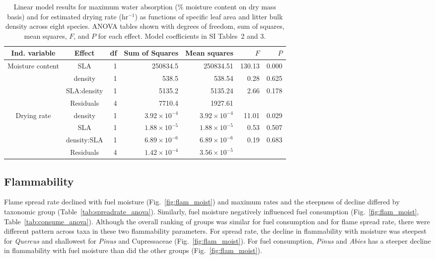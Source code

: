 \documentclass[letterpaper,12pt]{article}
\begin{document}
\begin{table}
  \caption{Linear model results for maximum water absorption (\% moisture
    content on dry mass basis) and for estimated drying rate (hr$^{-1}$) as
    functions of specific leaf area and litter bulk density across eight
    species. ANOVA tables shown with degrees of freedom, sum of squares, mean
    squares, $F$, and $P$ for each effect. Model coefficients in SI Tables~2 and 3.}
  \label{tab:mc_di_anova}
\centering
\begin{tabular}{ccrrrrr}
  \toprule
Ind. variable & Effect & df & Sum of Squares & Mean squares & $F$ & $P$ \\ 
  \midrule
Moisture content & SLA & 1 & 250834.5 & 250834.51 & 130.13 & 0.000 \\ 
                 & density & 1 & 538.5 & 538.54 & 0.28 & 0.625 \\ 
                 & SLA:density & 1 & 5135.2 & 5135.24 & 2.66 & 0.178 \\ 
                 & Residuals & 4 & 7710.4 & 1927.61 &  &  \\ 
  \midrule
Drying rate & density & 1 & $3.92 \times 10^{-4}$ & $3.92 \times 10^{-4}$ & 11.01 & 0.029 \\ 
            &  SLA & 1 & $1.88 \times 10^{-5}$ & $1.88 \times 10^{-5}$ & 0.53 & 0.507 \\ 
            &  density:SLA & 1 & $6.89 \times 10^{-6}$ & $6.89 \times 10^{-6}$ & 0.19 & 0.683 \\ 
            &  Residuals & 4 & $1.42 \times 10^{-4}$ & $3.56 \times 10^{-5}$ &  &  \\ 
  \bottomrule
\end{tabular}
\end{table}

\subsection*{Flammability}

Flame spread rate declined with fuel moisture (Fig.~\ref{fig:flam_moist}) and
maximum rates and the steepness of decline differed by taxonomic group
(Table~\ref{tab:spreadrate_anova}). Similarly, fuel moisture negatively
influenced fuel consumption (Fig.~\ref{fig:flam_moist},
Table~\ref{tab:consume_anova}). Although the overall ranking of groups was
similar for fuel consumption and for flame spread rate, there were different
pattern across taxa in these two flammability parameters. For spread rate, the
decline in flammability with moisture was steepest for \emph{Quercus} and
shallowest for \emph{Pinus} and Cupressaceae (Fig.~\ref{fig:flam_moist}). For
fuel consumption, \emph{Pinus} and \emph{Abies} has a steeper decline in
flammability with fuel moisture than did the other groups
(Fig.~\ref{fig:flam_moist}).
\end{document}
